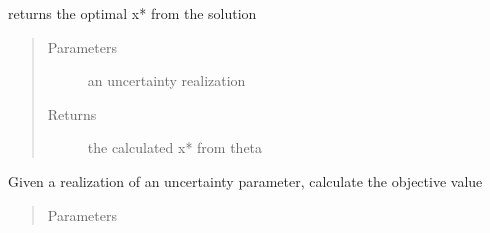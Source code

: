 \documentclass[letterpaper,10pt,english]{sphinxmanual}
\begin{document}
\begin{fulllineitems}
\begin{fulllineitems}
\label{\detokenize{ppopt:ppopt.solution.Solution.critical_regions}}
\end{fulllineitems}


\begin{fulllineitems}
\label{\detokenize{ppopt:ppopt.solution.Solution.evaluate}}
\sphinxAtStartPar
returns the optimal x* from the solution
\begin{quote}\begin{description}
\item[{Parameters}] \leavevmode
\sphinxAtStartPar
{} \textendash{} an uncertainty realization

\item[{Returns}] \leavevmode
\sphinxAtStartPar
the calculated x* from theta

\end{description}\end{quote}

\end{fulllineitems}


\begin{fulllineitems}
\label{\detokenize{ppopt:ppopt.solution.Solution.evaluate_objective}}
\sphinxAtStartPar
Given a realization of an uncertainty parameter, calculate the objective value
\begin{quote}\begin{description}
\item[{Parameters}] \leavevmode
\sphinxAtStartPar
{} \textendash{} 


\end{description}
\end{quote}
\end{fulllineitems}
\end{fulllineitems}
\end{document}
